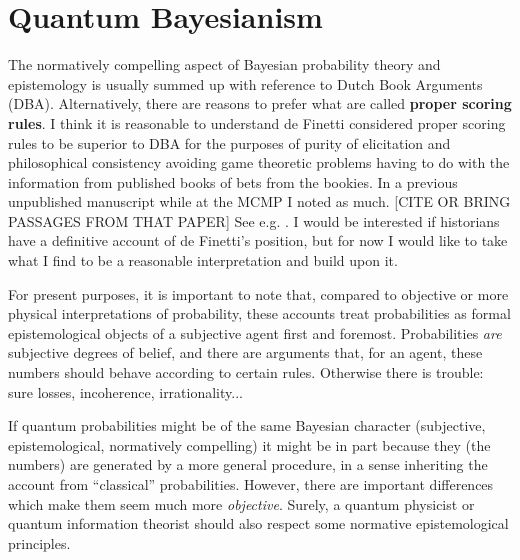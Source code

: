 


\section{Quantum Bayesianism}

The normatively compelling aspect of Bayesian probability theory and epistemology is usually summed up with reference to Dutch Book Arguments (DBA).  Alternatively, there are reasons to prefer what are called \textbf{proper scoring rules}.  I think it is reasonable to understand de Finetti considered proper scoring rules to be superior to DBA for the purposes of purity of elicitation and philosophical consistency avoiding game theoretic problems having to do with the information from published books of bets from the bookies.  In a previous unpublished manuscript while at the MCMP I noted as much.  [CITE OR BRING PASSAGES FROM THAT PAPER]  See e.g. \citep{deFinetti1981a, deFinetti1990, deFinetti2008}.  I would be interested if historians have a definitive account of de Finetti's position, but for now I would like to take what I find to be a reasonable interpretation and build upon it.




For present purposes, it is important to note that, compared to objective or more physical interpretations of probability, these accounts treat probabilities as formal epistemological objects of a subjective agent first and foremost.  Probabilities \emph{are} subjective degrees of belief, and there are arguments that, for an agent, these numbers should behave according to certain rules.  Otherwise there is trouble: sure losses, incoherence, irrationality...

If quantum probabilities might be of the same Bayesian character (subjective, epistemological, normatively compelling) it might be in part because they (the numbers) are generated by a more general procedure, in a sense inheriting the account from ``classical'' probabilities.  However, there are important differences which make them seem much more \emph{objective}.  Surely, a quantum physicist or quantum information theorist should also respect some normative epistemological principles.  
 

